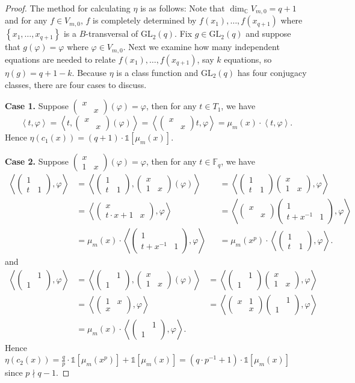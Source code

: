 \documentclass[10pt,a4paper]{amsart}
\newcommand{\BC}{\mathbb{C}}
\newcommand{\BF}{\mathbb{F}}
\newcommand{\GL}{\mathrm{GL}}
\newcommand{\cb}[1]{\left\{#1\right\}}
\newcommand{\fk}[1]{\left[#1\right]}
\newcommand{\jk}[1]{\left\langle#1\right\rangle}
\newcommand{\jz}[4]{{\begin{pmatrix}
		#1&#2\\
		#3&#4
\end{pmatrix}}}
\newcommand{\one}{\mathds{1}}
\newcommand{\pt}[1]{\left(#1\right)}
\begin{document}
\begin{proof}
	
	The method for calculating $\eta$ is as follows: Note that $\dim_{\BC}V_{m, 0} = q + 1$ and for any $f \in V_{m, 0}$, $f$ is completely determined by $f(x_1), \ldots, f(x_{q + 1})$ where $\cb{x_1, \ldots, x_{q + 1}}$ is a $B$-transversal of $\GL_2(q)$. Fix $g \in \GL_2(q)$ and suppose that $g(\varphi) = \varphi$ where $\varphi \in V_{m, 0}$. Next we examine how many independent equations are needed to relate $f(x_1), \ldots, f(x_{q + 1})$, say $k$ equations, so $\eta(g) = q + 1 - k$. Because $\eta$ is a class function and $\GL_2(q)$ has four conjugacy classes, there are four cases to discuss. 
	
	\textbf{Case 1.} Suppose $\jz{x}{}{}{x}(\varphi) = \varphi$, then for any $t \in T_1$, we have
	\[\jk{t, \varphi}
	= \jk{t, \jz{x}{}{}{x}(\varphi)}
	= \jk{\jz{x}{}{}{x}t, \varphi}
	= \mu_{m}(x)\cdot\jk{t, \varphi}.\]
	Hence $\eta\pt{c_1(x)} = (q + 1)\cdot\one\fk{{\mu_{m}(x)}}$.
	
	\textbf{Case 2.} Suppose $\jz{x}{}{1}{x}(\varphi) = \varphi$, then for any $t \in \BF_q$, we have
	\[\begin{aligned}
		\jk{\jz{1}{}{t}{1}, \varphi}
		&= \jk{\jz{1}{}{t}{1}, \jz{x}{}{1}{x}(\varphi)}
		&&= \jk{\jz{1}{}{t}{1}\jz{x}{}{1}{x}, \varphi} \\
		&= \jk{\jz{x}{}{t\cdot x + 1}{x}, \varphi}
		&&= \jk{\jz{x}{}{}{x}\jz{1}{}{t + x^{-1}}{1}, \varphi} \\
		&= \mu_{m}(x)\cdot\jk{\jz{1}{}{t + x^{-1}}{1}, \varphi}
		&&= \mu_{m}(x^p)\cdot\jk{\jz{1}{}{t}{1}, \varphi}.
	\end{aligned}\]
	and
	\[\begin{aligned}
		\jk{\jz{}{1}{1}{}, \varphi} 
		&= \jk{\jz{}{1}{1}{}, \jz{x}{}{1}{x}(\varphi)}
		&= \jk{\jz{}{1}{1}{}\jz{x}{}{1}{x}, \varphi} \\
		&= \jk{\jz{1}{x}{x}{}, \varphi}
		&= \jk{\jz{x}{1}{}{x}\jz{}{1}{1}{}, \varphi} \\
		&= \mu_{m}(x) \cdot \jk{\jz{}{1}{1}{}, \varphi}.
	\end{aligned}\]
	Hence $\eta\pt{c_2(x)} = \frac{q}{p}\cdot\one\fk{{\mu_{m}(x^p)}} + \one\fk{{\mu_{m}(x)}} = \pt{q\cdot p^{-1} + 1}\cdot\one\fk{\mu_m(x)}$ since $p \nmid q - 1$.
	

\end{proof}
\end{document}

